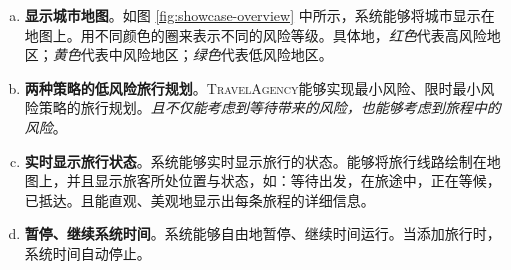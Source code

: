 \begin{enumerate}[(a)]
  \item \textbf{显示城市地图}。如图 \ref{fig:showcase-overview} 中所示，系统能够将城市显示在地图上。用不同颜色的圈来表示不同的风险等级。具体地，\textit{{\color{high-risk}红色}}代表高风险地区；\textit{{\color{mid-risk}黄色}}代表中风险地区；\textit{{\color{low-risk}绿色}}代表低风险地区。
  \item \textbf{两种策略的低风险旅行规划}。\textsc{TravelAgency}能够实现最小风险、限时最小风险策略的旅行规划。\textit{且不仅能考虑到等待带来的风险，也能够考虑到旅程中的风险}。
  \item \textbf{实时显示旅行状态}。系统能够实时显示旅行的状态。能够将旅行线路绘制在地图上，并且显示旅客所处位置与状态，如：等待出发，在旅途中，正在等候，已抵达。且能直观、美观地显示出每条旅程的详细信息。
  \item \textbf{暂停、继续系统时间}。系统能够自由地暂停、继续时间运行。当添加旅行时，系统时间自动停止。
\end{enumerate}








